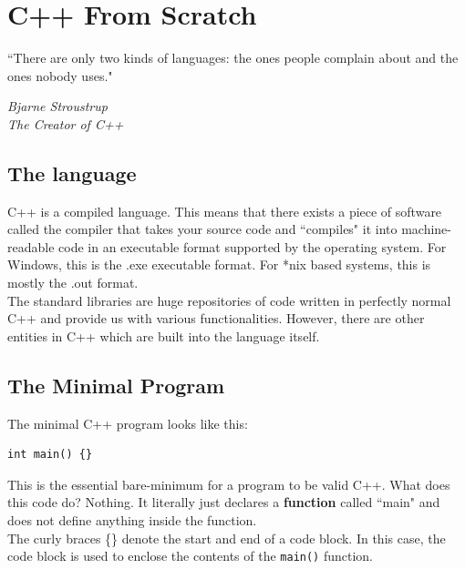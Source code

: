 \documentclass[letterpaper, 12pt]{book}
\begin{document}
\chapter{C++ From Scratch}
\epigraph{\centering ``There are only two kinds of languages: the ones people complain about and the ones nobody uses."}{\textit{Bjarne Stroustrup \\ The Creator of C++}}
\section{The language}
C++ is a compiled language. This means that there exists a piece of software called the compiler that takes your source code and ``compiles" it into machine-readable code in an executable format supported by the operating system. For Windows, this is the .exe executable format. For *nix based systems, this is mostly the .out format.\\
The standard libraries are huge repositories of code written in perfectly normal C++ and provide us with various functionalities. However, there are other entities in C++ which are built into the language itself.\\
\section{The Minimal Program}
The minimal C++ program looks like this:\\
\begin{lstlisting}
int main() {}
\end{lstlisting}
This is the essential bare-minimum for a program to be valid C++. What does this code do? Nothing. It literally just declares a \textbf{function} called ``main" and does not define anything inside the function.\\
The curly braces \{\} denote the start and end of a code block. In this case, the code block is used to enclose the contents of the \lstinline{main()} function. 
\end{document}
